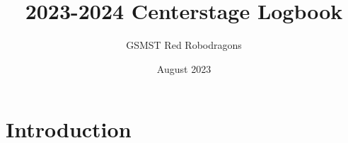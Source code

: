 \documentclass{article}
\title{2023-2024 Centerstage Logbook}
\author{GSMST Red Robodragons}
\date{August 2023}
\begin{document}
\maketitle

\section{Introduction}
\end{document}
